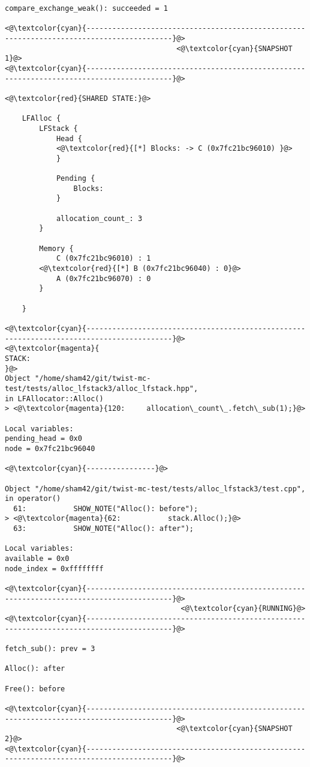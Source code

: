 \begin{adjustwidth}{-3.3cm}{-1cm}
\begin{allintypewriter}
\begin{multicols*}{2}
\begin{lstlisting}[numbers=none]
compare_exchange_weak(): succeeded = 1

<@\textcolor{cyan}{------------------------------------------------------------------------------------------}@>
                                        <@\textcolor{cyan}{SNAPSHOT 1}@>
<@\textcolor{cyan}{------------------------------------------------------------------------------------------}@>

<@\textcolor{red}{SHARED STATE:}@>

    LFAlloc {
	    LFStack {
		    Head {
			<@\textcolor{red}{[*] Blocks: -> C (0x7fc21bc96010) }@>
		    }

		    Pending {
			    Blocks: 
		    }

		    allocation_count_: 3
	    }

	    Memory {
		    C (0x7fc21bc96010) : 1
		<@\textcolor{red}{[*] B (0x7fc21bc96040) : 0}@>
		    A (0x7fc21bc96070) : 0
	    }

    }

<@\textcolor{cyan}{------------------------------------------------------------------------------------------}@>
<@\textcolor{magenta}{
STACK:
}@>
Object "/home/sham42/git/twist-mc-test/tests/alloc_lfstack3/alloc_lfstack.hpp",
in LFAllocator::Alloc()
> <@\textcolor{magenta}{120:     allocation\_count\_.fetch\_sub(1);}@>

Local variables: 
pending_head = 0x0
node = 0x7fc21bc96040

<@\textcolor{cyan}{----------------}@>

Object "/home/sham42/git/twist-mc-test/tests/alloc_lfstack3/test.cpp",
in operator()
  61:           SHOW_NOTE("Alloc(): before");
> <@\textcolor{magenta}{62:           stack.Alloc();}@>
  63:           SHOW_NOTE("Alloc(): after");

Local variables: 
available = 0x0
node_index = 0xffffffff

<@\textcolor{cyan}{------------------------------------------------------------------------------------------}@>
                                         <@\textcolor{cyan}{RUNNING}@>
<@\textcolor{cyan}{------------------------------------------------------------------------------------------}@>

fetch_sub(): prev = 3

Alloc(): after

Free(): before

<@\textcolor{cyan}{------------------------------------------------------------------------------------------}@>
                                        <@\textcolor{cyan}{SNAPSHOT 2}@>
<@\textcolor{cyan}{------------------------------------------------------------------------------------------}@>


\end{lstlisting}
\end{multicols*}
\end{allintypewriter}
\end{adjustwidth}
